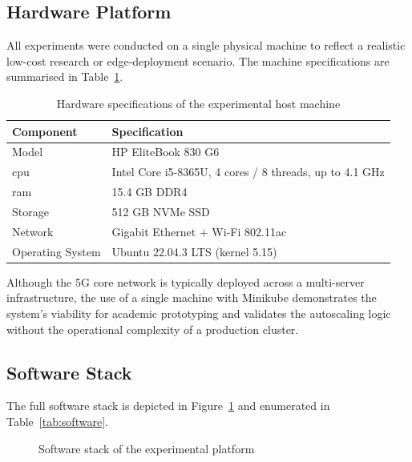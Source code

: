 \subsection{Hardware Platform}

All experiments were conducted on a single physical machine to reflect a realistic low-cost research or edge-deployment scenario. The machine specifications are summarised in Table~\ref{tab:hardware}.

\begin{table}[H]
  \centering
  \caption{Hardware specifications of the experimental host machine}
  \label{tab:hardware}
  \begin{tabularx}{\linewidth}{lX}
    \toprule
    \textbf{Component} & \textbf{Specification} \\
    \midrule
    Model      & HP EliteBook 830 G6 \\
    \gls{cpu}  & Intel Core i5-8365U, 4 cores / 8 threads, up to 4.1 GHz \\
    \gls{ram}  & 15.4 GB DDR4 \\
    Storage    & 512 GB NVMe SSD \\
    Network    & Gigabit Ethernet + Wi-Fi 802.11ac \\
    Operating System & Ubuntu 22.04.3 LTS (kernel 5.15) \\
    \bottomrule
  \end{tabularx}
\end{table}

Although the \gls{5G} core network is typically deployed across a multi-server infrastructure, the use of a single machine with Minikube demonstrates the system's viability for academic prototyping and validates the autoscaling logic without the operational complexity of a production cluster.

\subsection{Software Stack}

The full software stack is depicted in Figure~\ref{fig:software_stack} and enumerated in Table~\ref{tab:software}.

\begin{figure}[H]
  \centering
  \caption{Software stack of the experimental platform}
  \label{fig:software_stack}
\end{figure}

